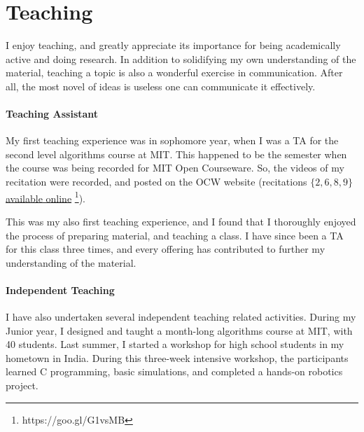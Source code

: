 \section{Teaching}
I enjoy teaching, and greatly appreciate its importance for being academically active and doing research.
In addition to solidifying my own understanding of the material, teaching a topic is also a wonderful exercise in communication.
After all, the most novel of ideas is useless one can communicate it effectively.

\paragraph{Teaching Assistant}
\label{par:teaching_assistant}
My first teaching experience was in sophomore year, when I was a TA for the second level algorithms course at MIT.
This happened to be the semester when the course was being recorded for MIT Open Courseware.
So, the videos of my recitation were recorded, and posted on the OCW website (recitations $\{2,6,8,9\}$
\href{https://goo.gl/G1vsMB}{available online}
\footnote{https://goo.gl/G1vsMB}).

This was my also first teaching experience, and I found that
I thoroughly enjoyed the process of preparing material, and teaching a class.
I have since been a TA for this class three times, and every offering has contributed to further my understanding of the material.

\paragraph{Independent Teaching}
\label{par:independent_teaching}
I have also undertaken several independent teaching related activities.
During my Junior year, I designed and taught a month-long algorithms course at MIT, with 40 students.
Last summer, I started a workshop for high school students in my hometown in India.
During this three-week intensive workshop, the participants learned C programming,
basic simulations, and completed a hands-on robotics project.
